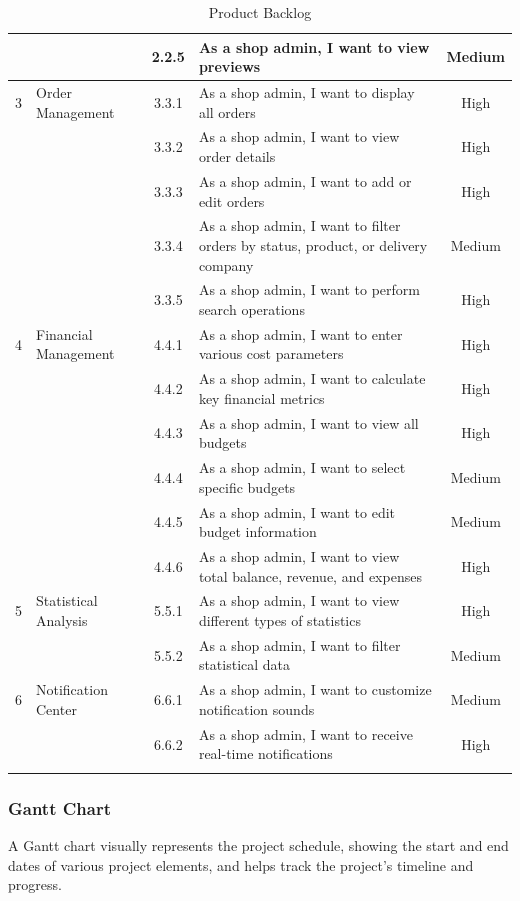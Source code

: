 \begin{longtable}{|c|p{4cm}|c|p{6cm}|c|}
& & 2.2.5 & As a shop admin, I want to view previews & Medium \\ \hline
\multirow{1}{*}{3} & \multirow{1}{*}{Order Management} & 3.3.1 & As a shop admin, I want to display all orders & High \\ \cline{3-5}
& & 3.3.2 & As a shop admin, I want to view order details & High \\ \cline{3-5}
& & 3.3.3 & As a shop admin, I want to add or edit orders & High \\ \cline{3-5}
& & 3.3.4 & As a shop admin, I want to filter orders by status, product, or delivery company & Medium \\ \cline{3-5}
& & 3.3.5 & As a shop admin, I want to perform search operations & High \\ \hline
\multirow{1}{*}{4} & \multirow{1}{*}{Financial Management} & 4.4.1 & As a shop admin, I want to enter various cost parameters & High \\ \cline{3-5}
& & 4.4.2 & As a shop admin, I want to calculate key financial metrics & High \\ \cline{3-5}
& & 4.4.3 & As a shop admin, I want to view all budgets & High \\ \cline{3-5}
& & 4.4.4 & As a shop admin, I want to select specific budgets & Medium \\ \cline{3-5}
& & 4.4.5 & As a shop admin, I want to edit budget information & Medium \\ \cline{3-5}
& & 4.4.6 & As a shop admin, I want to view total balance, revenue, and expenses & High \\ \hline
\multirow{1}{*}{5} & \multirow{1}{*}{Statistical Analysis} & 5.5.1 & As a shop admin, I want to view different types of statistics & High \\ \cline{3-5}
& & 5.5.2 & As a shop admin, I want to filter statistical data & Medium \\ \hline
\multirow{1}{*}{6} & \multirow{1}{*}{Notification Center} & 6.6.1 & As a shop admin, I want to customize notification sounds & Medium \\ \cline{3-5}
& & 6.6.2 & As a shop admin, I want to receive real-time notifications & High \\ \hline

\caption{Product Backlog}
\label{tab:product_backlog}
\end{longtable}

\subsubsection{Gantt Chart}
A Gantt chart visually represents the project schedule, showing the start and end dates of various project elements, and helps track the project's timeline and progress.


